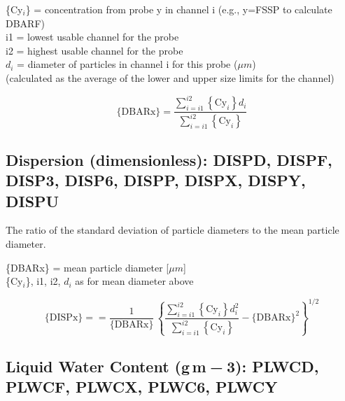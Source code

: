 \documentclass[
  english,
]{book}
\begin{document}
\{Cy\(_{i}\)\} = concentration
from probe y in channel i
\hspace*{0.6cm}(e.g., y=FSSP to calculate DBARF)\\
i1 = lowest usable channel for the probe\\
i2 = highest usable channel for the probe\\
\(d_{i}\)
= diameter of particles in channel i for this probe (\(\mu m\))\\
\hspace*{0.6cm}(calculated as the average of the lower and upper
size limits for the channel)

\begin{equation}
\mathrm{\{DBARx\}}=\frac{{\textstyle \sum_{i=i1}^{i2}}{\displaystyle {\displaystyle \left\{ \mathrm{Cy}_{i}\right\} d_{i}}}}{\sum_{i=i1}^{i2}\left\{ \mathrm{Cy}_{i}\right\} }
\label{eq:DBARbox}
\end{equation}

\hypertarget{dispersion}{%
\subsection*{Dispersion (dimensionless): DISPD, DISPF, DISP3, DISP6, DISPP, DISPX, DISPY, DISPU}\label{dispersion}}

The ratio of the standard deviation of particle diameters to the mean particle diameter.

\{DBARx\} = mean particle diameter {[}\(\mu m\){]}\\
\{Cy\(_{i}\)\}, i1, i2, \(d_{i}\) as for mean diameter above

\begin{equation}
\mathrm{\{DISPx\}}==\frac{1}{\{\mathrm{DBARx}\}}\,\left\{ \frac{{\textstyle \sum_{i=i1}^{i2}}{\displaystyle {\displaystyle \left\{ \mathrm{Cy}_{i}\right\} d_{i}^{2}}}}{\sum_{i=i1}^{i2}\left\{ \mathrm{Cy}_{i}\right\} }-\{\mathrm{DBARx}\}^{2}\right\} ^{1/2}
\label{eq:DISPbox}
\end{equation}

\hypertarget{PSD-LWC}{%
\subsection*{\texorpdfstring{Liquid Water Content (g m{ − 3}): PLWCD, PLWCF, PLWCX, PLWC6, PLWCY}{Liquid Water Content (g m − 3): PLWCD, PLWCF, PLWCX, PLWC6, PLWCY}}\label{PSD-LWC}}
\end{document}
